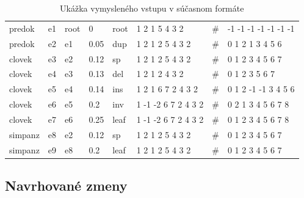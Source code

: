 \begin{table}[!htb]
\label{tab:vstup}
\begin{center}
\begin{tabular}{llllllll}
predok & e1 & root & 0 & root & 1 2 1 5 4 3 2 & \#  & -1 -1 -1 -1 -1 -1 -1 \\
predok & e2 & e1 &  0.05 & dup &  1 2 1 2 5 4 3 2 & \# & 0 1 2 1 3 4 5 6 \\
clovek & e3 & e2 &  0.12 & sp &   1 2 1 2 5 4 3 2 & \# & 0 1 2 3 4 5 6 7 \\
clovek & e4 & e3 &  0.13 & del & 1 2 1 2 4 3 2 & \# & 0 1 2 3 5 6 7 \\
clovek & e5 & e4 &  0.14 & ins & 1 2 1 6 7 2 4 3 2 & \# & 0 1 2 -1 -1 3 4 5 6 \\
clovek &  e6 & e5 &  0.2 & inv &  1 -1 -2 6 7 2 4 3 2 & \# & 0 2 1 3 4 5 6 7 8 \\
clovek & e7 & e6 &  0.25 & leaf & 1 -1 -2 6 7 2 4 3 2 & \# & 0 1 2 3 4 5 6 7 8 \\
simpanz & e8 & e2  & 0.12 & sp &  1 2 1 2 5 4 3 2 & \# & 0 1 2 3 4 5 6 7 \\
simpanz & e9 & e8 &  0.2 & leaf & 1 2 1 2 5 4 3 2 & \# & 0 1 2 3 4 5 6 7 \\
 \end{tabular}

\end{center}
\caption{Ukážka vymysleného vstupu v súčasnom formáte \cite{biowiki}}
\end{table}

\subsection{Navrhované zmeny}
